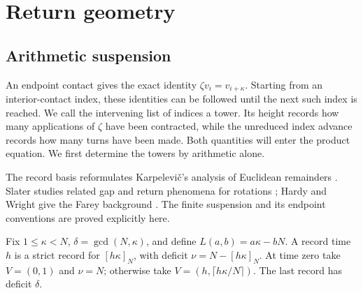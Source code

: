 \documentclass[11pt,a4paper]{article}
\theoremstyle{definition}
\theoremstyle{remark}
\numberwithin{equation}{section}
\begin{document}

\section{Return geometry}
\subsection{Arithmetic suspension}\label{sec:return-arithmetic}
An endpoint contact gives the exact identity $\zeta v_i=v_{i+\kappa}$.
Starting from an interior-contact index, these identities can be followed
until the next such index is reached. We call the intervening list of
indices a tower. Its height records how many applications of $\zeta$
have been contracted, while the unreduced index advance records how
many turns have been made. Both quantities will enter the product
equation. We first determine the towers by arithmetic alone.

The record basis reformulates Karpelevi\v{c}'s analysis of Euclidean
remainders \cite[\S3, Lemma~2 and Theorems~III--IV]{Karp}.
Slater studies related gap and return phenomena for rotations
\cite{Slater}; Hardy and Wright give the Farey background
\cite[Chapter~III]{HardyWright}. The finite suspension and its endpoint
conventions are proved explicitly here.

Fix $1\le\kappa<N$, $\delta=\gcd(N,\kappa)$, and define $L(a,b)=a\kappa-bN$. A record time $h$ is a strict record for $[h\kappa]_N$, with deficit $\nu=N-[h\kappa]_N$. At time zero take $V=(0,1)$ and $\nu=N$; otherwise take $V=(h,\lceil h\kappa/N\rceil)$. The last record has deficit $\delta$.
\end{document}
